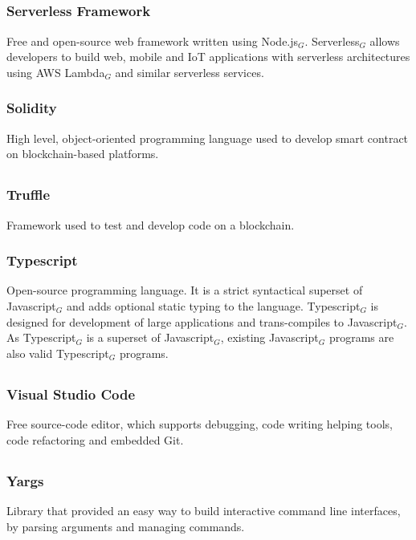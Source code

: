 	\subsection*{}
		\subsubsection*{Serverless Framework}
			Free and open-source web framework written using Node.js$_{G}$. Serverless$_{G}$ allows developers to build web, mobile and IoT applications with serverless architectures using AWS Lambda$_{G}$ and similar serverless services.
		\subsubsection*{Solidity}
			High level, object-oriented programming language used to develop smart contract on blockchain-based platforms.
		
	\subsection*{}
		\subsubsection*{Truffle}
			Framework used to test and develop code on a blockchain.
		\subsubsection*{Typescript}
			Open-source programming language. It is a strict syntactical superset of Javascript$_{G}$ and adds optional static typing to the language. Typescript$_{G}$ is designed for development of large applications and trans-compiles to Javascript$_{G}$. As Typescript$_{G}$ is a superset of Javascript$_{G}$, existing Javascript$_{G}$ programs are also valid Typescript$_{G}$ programs.
			
	\subsection*{}
		\subsubsection*{Visual Studio Code}
			Free source-code editor, which supports debugging, code writing helping tools, code refactoring and embedded Git.
	
	\subsection*{}
		\subsubsection*{Yargs}
			Library that provided an easy way to build interactive command line interfaces, by parsing arguments and managing commands. 
	